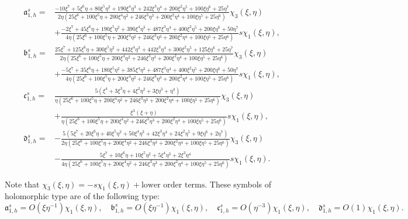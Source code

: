 \documentclass[10pt]{amsart}
\theoremstyle{remark}
\theoremstyle{definition}
\numberwithin{equation}{section}
\newcommand{\f}{\frac}
\begin{document}
\begin{align*}
\mathfrak{a}^s_{1, h}=&\f{-10\xi^7 + 5\xi^6\eta + 80\xi^5\eta^2 + 190\xi^4\eta^3+242\xi^3\eta^4+ 200\xi^2\eta^5+100\xi\eta^6+ 25\eta^7}{2\eta(25\xi^6+100\xi^5\eta+200\xi^4\eta^2+246\xi^3\eta^3+200\xi^2\eta^4+100\xi\eta^5+25\eta^6)}\chi_{3}(\xi,\eta)\\ 
&+\f{-2\xi^7 + 45\xi^6\eta + 190\xi^5\eta^2 + 390\xi^4\eta^3+487\xi^3\eta^4+ 400\xi^2\eta^5+200\xi\eta^6+ 50\eta^7}{4\eta(25\xi^6+100\xi^5\eta+200\xi^4\eta^2+246\xi^3\eta^3+200\xi^2\eta^4+100\xi\eta^5+25\eta^6)}s\chi_{1}(\xi,\eta),\\
\mathfrak{b}^s_{1, h}=&\f{25\xi^7 + 125\xi^6\eta + 300\xi^5\eta^2 + 442\xi^4\eta^3+442\xi^3\eta^4+ 300\xi^2\eta^5+125\xi\eta^6+ 25\eta^7}
{2\eta(25\xi^6+100\xi^5\eta+200\xi^4\eta^2+246\xi^3\eta^3+200\xi^2\eta^4+100\xi\eta^5+25\eta^6)}\chi_{3}(\xi,\eta)\\
&+ \f{-5\xi^7 + 35\xi^6\eta + 180\xi^5\eta^2 + 385\xi^4\eta^3+487\xi^3\eta^4+ 400\xi^2\eta^5+200\xi\eta^6+ 50\eta^7}
{4\eta(25\xi^6+100\xi^5\eta+200\xi^4\eta^2+246\xi^3\eta^3+200\xi^2\eta^4+100\xi\eta^5+25\eta^6)}s\chi_{1}(\xi,\eta) ,\\
\mathfrak{c}^s_{1, h}=&\f{5(\xi^4+3\xi^3\eta + 4\xi^2\eta^2+3\xi\eta^3+\eta^4)}
{\eta(25\xi^6+100\xi^5\eta+200\xi^4\eta^2+246\xi^3\eta^3+200\xi^2\eta^4+100\xi\eta^5+25\eta^6)}\chi_{3}(\xi,\eta)\\
&+\f{\xi^3(\xi+\eta)}
{\eta(25\xi^6+100\xi^5\eta+200\xi^4\eta^2+246\xi^3\eta^3+200\xi^2\eta^4+100\xi\eta^5+25\eta^6)}s\chi_{1}(\xi,\eta),\\
\mathfrak{d}^s_{1, h}=&-\f{5( 5\xi^7 + 20\xi^6\eta + 40\xi^5\eta^2 + 50\xi^4\eta^3+42\xi^3\eta^4+ 24\xi^2\eta^5+9\xi\eta^6+ 2\eta^7)}
{2\eta(25\xi^6+100\xi^5\eta+200\xi^4\eta^2+246\xi^3\eta^3+200\xi^2\eta^4+100\xi\eta^5+25\eta^6)}\chi_{3}(\xi,\eta)\\
&-\f{ 5\xi^7 + 10\xi^6\eta + 10\xi^5\eta^2 + 5\xi^4\eta^3+2\xi^3\eta^4}
{4\eta(25\xi^6+100\xi^5\eta+200\xi^4\eta^2+246\xi^3\eta^3+200\xi^2\eta^4+100\xi\eta^5+25\eta^6)}s\chi_{1}(\xi,\eta).
\end{align*}

Note that $\chi_3(\xi, \eta) = -s\chi_1(\xi,\eta) + \text{lower order terms}$.
These symbols of holomorphic type are of the following type:
\begin{equation*}
\mathfrak{a}^s_{1, h} = O(\xi \eta^{-1})\chi_{1}(\xi, \eta), \quad \mathfrak{b}^s_{1, h} = O( \xi \eta^{-1})\chi_{1}(\xi, \eta),  \quad \mathfrak{c}^s_{1, h} =O(\eta^{-3})\chi_{1}(\xi, \eta), \quad \mathfrak{d}^s_{1, h} = O(1) \chi_{1}(\xi, \eta).   
\end{equation*}
\end{document}
